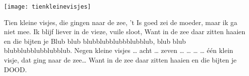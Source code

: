 
\begin{intersong}
    \texttt{[image: tienkleinevisjes]}
\end{intersong}
\beginverse*
Tien kleine visjes, die gingen naar de zee,
't Is goed zei de moeder, maar ik ga niet mee. 
Ik blijf liever in de vieze, vuile sloot,
Want in de zee daar zitten haaien en die bijten je
Blub blub blubblubblubbblubblub, blub blub blubblubblubblubblub.
\endverse
\beginverse*
Negen kleine visjes … acht … zeven … … … …
\endverse
\beginverse*
één klein visje, dat ging naar de zee…
Want in de zee daar zitten haaien en die bijten je DOOD. 
\endverse
\endsong
